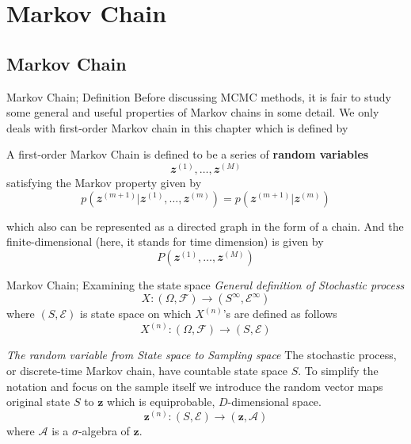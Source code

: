 \documentclass{bredelebeamer}
\begin{document}
\section{Markov Chain}
\subsection{Markov Chain}
\begin{frame}{Markov Chain; Definition}
  Before discussing MCMC methods, it is fair to study some general and useful
  properties of Markov chains in some detail. We only deals with first-order
  Markov chain in this chapter which is defined by
  \begin{definition}
    A first-order Markov Chain is defined to be a series of \textbf{random variables}
    \begin{equation}
      \mathbfit{z}^{(1)}, \ldots, \mathbfit{z}^{(M)}
    \end{equation}
    satisfying the Markov property given by
    \begin{equation*}
      p(\mathbfit{z}^{(m+1)}|\mathbfit{z}^{(1)}, \ldots, \mathbfit{z}^{(m)})
      = p(\mathbfit{z}^{(m+1)}|\mathbfit{z}^{(m)})
    \end{equation*}
  \end{definition}
  which also can be represented as a directed graph in the form of a chain.
  And the finite-dimensional (here, it stands for time dimension) is given by
  \begin{equation}
    P (\mathbfit{z}^{(1)}, \ldots, \mathbfit{z}^{(M)})
  \end{equation}

\end{frame}

\begin{frame}{Markov Chain; Examining the state space}
  \textit{General definition of Stochastic process}
  \begin{equation}
    X : (\Omega, \mathcal{F}) \rightarrow (S^{\infty},\mathcal{E}^{\infty})
  \end{equation}
  where $(S, \mathcal{E})$ is state space on which $X^{(n)}$'s are defined as
  follows
  \begin{equation}
    X^{(n)} :  (\Omega, \mathcal{F}) \rightarrow (S, \mathcal{E})
  \end{equation}

  \textit{The random variable from State space to Sampling space}
  The stochastic process, or discrete-time Markov chain, have countable
  state space $S$. To simplify the notation and focus on the sample itself
  we introduce the random vector maps original state $S$ to $\mathbf{z}$ which
  is equiprobable, $D$-dimensional space.
  \begin{equation}
    \mathbf{z}^{(n)}: (S, \mathcal{E}) \rightarrow (\mathbf{z}, \mathcal{A})
  \end{equation}
  where $\mathcal{A}$ is a $\sigma$-algebra of $\mathbf{z}$.
\end{frame}
\end{document}
